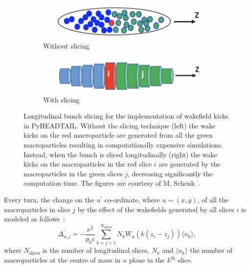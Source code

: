 {\begin{enumerate}
    \begin{figure}[!ht]
        \centering
        \begin{subfigure}[t]{0.45\textwidth}
            \centering
            \includegraphics[width=1\textwidth]{images/Ch2/before_slicing.png}
            \caption{Without slicing}
        \end{subfigure}
        \hfill
        \begin{subfigure}[t]{0.45\textwidth}
            \centering
            \includegraphics[width=1\textwidth]{images/Ch2/after_slicing.png}
            \caption{With slicing}
        \end{subfigure}
        \hfill
         \caption{Longitudinal bunch slicing for the implementation of wakefield kicks in PyHEADTAIL. Without the slicing technique (left) the wake kicks on the red macroparticle are generated from all the green macroparticles resulting in computationally expensive simulations. Instead, when the bunch is sliced longitudinally (right) the wake kicks on the macroparticles in the red slice $i$ are generated by the macroparticles in the green slices $j$, decreasing significantly the computation time. The figures are courtesy of M. Schenk~\cite{pyheadtail_schenk}.} %
         \label{fig:longitudinal_slicing_wakefields}
     \end{figure}
       
    Every turn, the change on the $u^\prime$ co-ordinate, where $u=(x,y)$, of all the macroparticles in slice $j$ by the effect of the wakefields generated by all slices $i$ is modeled as follows~\cite{pyheadtail_manual_adrian}:
    \begin{equation}\label{eq:wakefield_kick_pyheadtail}
        \Delta_{u,j}^\prime = - \frac{e^2}{p_0 c}\sum_{k=j+1}^{N_\mathrm{slices}}N_k W_u(k(z_i-z_j))\langle u_k \rangle,
    \end{equation}
    where $N_\mathrm{slices}$ is the number of longitudinal slices, $N_k$ and $\langle u_k \rangle$ the number of macroparticles at the centre of mass in $u$ plane in the $k^\mathrm{th}$ slice.
    

\end{enumerate}}
